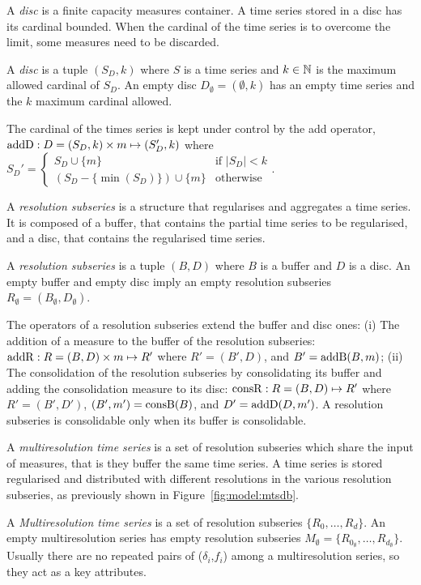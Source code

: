 A \emph{disc} is a finite capacity measures container. A time series
stored in a disc has its cardinal bounded. When the cardinal of the
time series is to overcome the limit, some measures need to be
discarded.
\begin{definition}%
  A \emph{disc} is a tuple $(S_D,k)$ where $S$ is a time series and
  $k\in\mathbb{N}$ is the maximum allowed cardinal of $S_D$.  An empty
  disc $D_{\emptyset} = (\emptyset,k)$ has an empty time series and
  the $k$ maximum cardinal allowed.
\end{definition}

The cardinal of the times series is kept under control by the add
operator, $\operatorname{addD} : D=(S_D,k)\times m\mapsto (S'_D,k)$ where %
$
 S_D' = \begin{cases}
  S_D\cup\{m\}                 & \text{if } |S_D|<k  \\
  (S_D-\{\min(S_D)\}) \cup \{m\} & \text{otherwise}
\end{cases}  
$.


A \emph{resolution subseries} is a structure that regularises and
aggregates a time series. It is composed of a buffer, that contains
the partial time series to be regularised, and a disc, that contains
the regularised time series.
\begin{definition}%
  A \emph{resolution subseries} is a tuple $(B,D)$ where $B$ is a
  buffer and $D$ is a disc.  An empty buffer and empty disc imply an
  empty resolution subseries $R_{\emptyset} =
  (B_{\emptyset},D_{\emptyset})$.
\end{definition}
 
The operators of a resolution subseries extend the buffer and disc
ones: (i) The addition of a measure to the buffer of the resolution
subseries: $\operatorname{addR} : R=(B,D) \times m \mapsto R'$ where $R'= (B',D)$,
and $B'= \operatorname{addB}(B,m)$; (ii) The consolidation of the resolution
subseries by consolidating its buffer and adding the consolidation
measure to its disc: $\operatorname{consR} : R=(B,D) \mapsto R'$ where $R'=
(B',D')$, $(B',m') = \operatorname{consB}(B)$, and $D'= \operatorname{addD}(D,m')$.  A resolution
subseries is consolidable only when its buffer is consolidable.




A \emph{multiresolution time series} is a set of resolution subseries
which share the input of measures, that is they buffer the same time
series. A time series is stored regularised and distributed with
different resolutions in the various resolution subseries, as
previously shown in Figure~\ref{fig:model:mtsdb}.
\begin{definition}%
  A \emph{Mul\-ti\-re\-solution time series} is a set of resolution
  subseries $\{R_0, \dots, R_d\}$.  An empty multiresolution series
  has empty resolution subseries $M_{\emptyset}=\{R_{0_\emptyset},
  \dots, R_{d_\emptyset}\}$. Usually there are no repeated pairs of
  ($\delta_i$,$f_i$) among a multiresolution series, so they act as a
  key attributes.
\end{definition}


